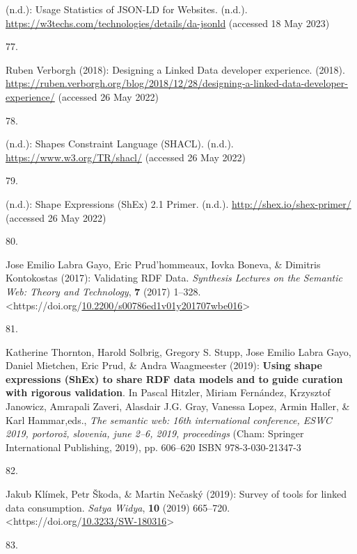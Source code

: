 \begin{thebibliography}{9}
(n.d.): {Usage Statistics of JSON-LD for Websites}. (n.d.).
\url{https://w3techs.com/technologies/details/da-jsonld} (accessed 18
May 2023)

\hypertarget{ref-DesigningLinkedData2018}{}
77.

Ruben Verborgh (2018): Designing a {Linked Data} developer experience.
(2018).
\url{https://ruben.verborgh.org/blog/2018/12/28/designing-a-linked-data-developer-experience/}
(accessed 26 May 2022)

\hypertarget{ref-w3-shacl}{}
78.

(n.d.): Shapes {Constraint Language} ({SHACL}). (n.d.).
\url{https://www.w3.org/TR/shacl/} (accessed 26 May 2022)

\hypertarget{ref-ShapeExpressionsShEx}{}
79.

(n.d.): Shape {Expressions} ({ShEx}) 2.1 {Primer}. (n.d.).
\url{http://shex.io/shex-primer/} (accessed 26 May 2022)

\hypertarget{ref-gayoValidatingRDFData2017a}{}
80.

Jose Emilio Labra Gayo, Eric Prud'hommeaux, Iovka Boneva, \& Dimitris
Kontokostas (2017): Validating {RDF Data}. \emph{Synthesis Lectures on
the Semantic Web: Theory and Technology}, \textbf{7} (2017) 1--328.
\textless https://doi.org/\href{https://doi.org/10.2200/s00786ed1v01y201707wbe016}{10.2200/s00786ed1v01y201707wbe016}\textgreater{}

\hypertarget{ref-thorntonUsingShapeExpressions2019a}{}
81.

Katherine Thornton, Harold Solbrig, Gregory S. Stupp, Jose Emilio Labra
Gayo, Daniel Mietchen, Eric Prud, \& Andra Waagmeester (2019):
\textbf{Using shape expressions ({ShEx}) to share {RDF} data models and
to guide curation with rigorous validation}. In Pascal Hitzler, Miriam
Fernández, Krzysztof Janowicz, Amrapali Zaveri, Alasdair J.G. Gray,
Vanessa Lopez, Armin Haller, \& Karl Hammar,eds., \emph{The semantic
web: 16th international conference, {ESWC} 2019, portorož, slovenia,
june 2--6, 2019, proceedings} ({Cham}: {Springer International
Publishing}, 2019), pp. 606--620 ISBN 978-3-030-21347-3

\hypertarget{ref-klimekSurveyToolsLinked2019a}{}
82.

Jakub Klímek, Petr Škoda, \& Martin Nečaský (2019): Survey of tools for
linked data consumption. \emph{Satya Widya}, \textbf{10} (2019)
665--720.
\textless https://doi.org/\href{https://doi.org/10.3233/SW-180316}{10.3233/SW-180316}\textgreater{}

\hypertarget{ref-wolstencroftRightFieldEmbeddingOntology2011b}{}
83.


\end{thebibliography}
